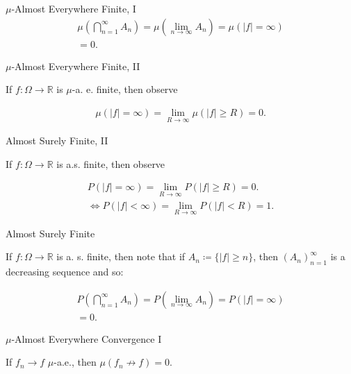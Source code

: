 \documentclass[10pt,landscape]{article}
\renewcommand{\geq}{\geqslant}
\begin{document}
\begin{multicols}{3}
\begin{observation}{}{$\mu$-Almost Everywhere Finite, I}
        \begin{align*}
            \mu\left(\bigcap_{n=1}^{\infty} A_n\right) = \mu\left(\lim_{n \to \infty} A_n\right) = \mu(|f| = \infty) \\ = 0.
        \end{align*}

\end{observation}

\begin{observation}{}{$\mu$-Almost Everywhere Finite, II}

    If $f: \Omega \to \mathbb{R}$ is $\mu$-a. e. finite, then observe

        \begin{align*}
            \mu(|f| = \infty) = \lim_{R \to \infty} \mu(|f| \geq R) = 0.
        \end{align*}

\end{observation}

\begin{observation}{}{Almost Surely Finite, II}

    If $f: \Omega \to \mathbb{R}$ is a.s. finite, then observe

        \begin{align*}
            P(|f| = \infty) = \lim_{R \to \infty} P(|f| \geq R) = 0. \\
            \iff P(|f| < \infty) = \lim_{R \to \infty} P(|f| < R) = 1.
        \end{align*}

\end{observation}

\begin{observation}{}{Almost Surely Finite}

    If $f: \Omega \to \mathbb{R}$ is a. s. finite, then note that if $A_n \coloneqq \{ |f| \geq n \}$, then $(A_n)_{n=1}^{\infty}$ is a decreasing sequence and so:

        \begin{align*}
            P\left(\bigcap_{n=1}^{\infty} A_n\right) = P\left(\lim_{n \to \infty} A_n\right) = P(|f| = \infty) \\ = 0.
        \end{align*}

\end{observation}

\begin{observation}{}{$\mu$-Almost Everywhere Convergence I}

    If $f_n \to f$ $\mu$-a.e., then $\mu(f_n \not\to f) = 0$.


\end{observation}
\end{multicols}
\end{document}
